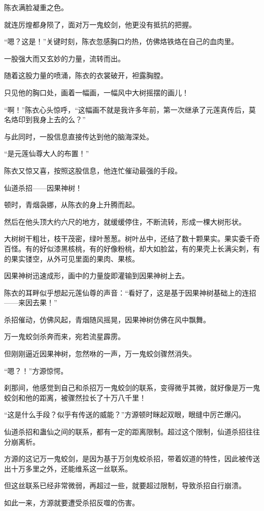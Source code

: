 \begin{this_body}
陈衣满脸凝重之色。

就连厉煌都身陨了，面对万一鬼蛟剑，他更没有抵抗的把握。

“嗯？这是！”关键时刻，陈衣忽感胸口灼热，仿佛烙铁烙在自己的血肉里。

一股强大而又玄妙的力量，流转而出。

随着这股力量的喷涌，陈衣的衣裳破开，袒露胸膛。

只见他的胸口处，画着一幅画，一幅风中大树摇摆的画儿！

“啊！”陈衣心头惊呼，“这幅画不就是我许多年前，第一次继承了元莲真传后，莫名烙印到我身上去的么？”

与此同时，一股信息直接传达到他的脑海深处。

“是元莲仙尊大人的布置！”

陈衣又惊又喜，按照这股信息，他连忙催动最强的手段。

仙道杀招——因果神树！

顿时，青烟袅娜，从陈衣的身上升腾而起。

然后在他头顶大约六尺的地方，就缓缓停住，不断流转，形成一棵大树形状。

大树树干粗壮，枝干茂密，绿叶葱葱。树叶丛中，还结了数十颗果实。果实委千奇百怪。有的好似漆黑核桃，有的好像粉桃，却大如脸盆，有的果壳上长满尖刺，有的果实镂空，从外可见里面的果肉、果核。

因果神树迅速成形，画中的力量旋即灌输到因果神树上去。

陈衣的耳畔似乎想起元莲仙尊的声音：“看好了，这是基于因果神树基础上的连招——来因去果！”

杀招催动，仿佛风起，青烟随风摇晃，因果神树仿佛在风中飘舞。

万一鬼蛟剑杀奔而来，宛若流星霹雳。

但刚刚逼近因果神树，忽然咻的一声，万一鬼蛟剑骤然消失。

“嗯？！”方源惊愕。

刹那间，他感觉到自己和杀招万一鬼蛟剑的联系，变得微乎其微，就好像是万一鬼蛟剑和他的距离，被骤然拉长了十万八千里！

“这是什么手段？似乎有传送的威能？”方源顿时眯起双眼，眼缝中厉芒爆闪。

仙道杀招和蛊仙之间的联系，都有一定的距离限制。超过这个限制，仙道杀招往往分崩离析。

方源的这记万一鬼蛟剑，是因为基于万剑鬼蛟杀招，带着奴道的特性，因此被传送出十万多里之外，还能维系这一丝联系。

但这丝联系已经非常微弱，再超过一些，就要超过限制，导致杀招自行崩溃。

如此一来，方源就要遭受杀招反噬的伤害。


\end{this_body}
